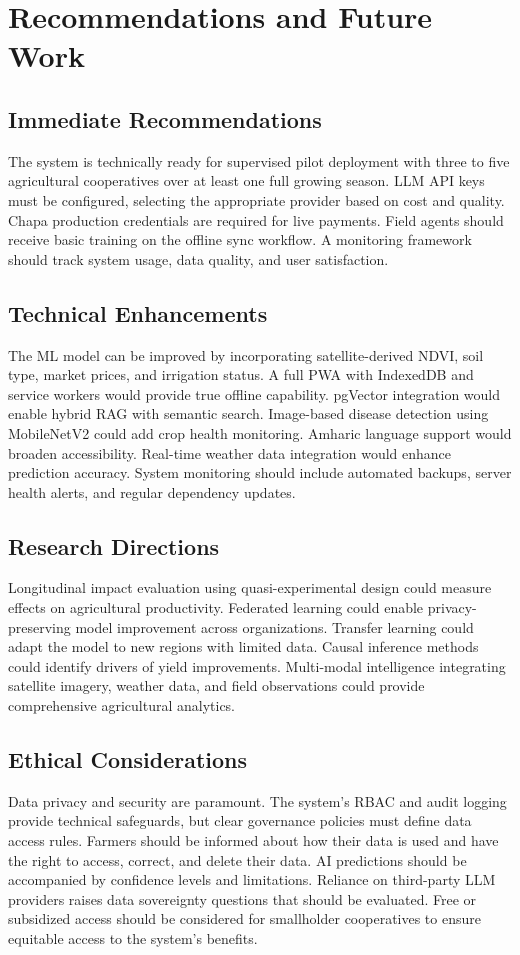 \documentclass[12pt,a4paper,oneside]{report}
\begin{document}
\section{Recommendations and Future Work}
\subsection{Immediate Recommendations}
The system is technically ready for supervised pilot deployment with three to five agricultural cooperatives over at least one full growing season. LLM API keys must be configured, selecting the appropriate provider based on cost and quality. Chapa production credentials are required for live payments. Field agents should receive basic training on the offline sync workflow. A monitoring framework should track system usage, data quality, and user satisfaction.

\subsection{Technical Enhancements}
The ML model can be improved by incorporating satellite-derived NDVI, soil type, market prices, and irrigation status. A full PWA with IndexedDB and service workers would provide true offline capability. pgVector integration would enable hybrid RAG with semantic search. Image-based disease detection using MobileNetV2 could add crop health monitoring. Amharic language support would broaden accessibility. Real-time weather data integration would enhance prediction accuracy. System monitoring should include automated backups, server health alerts, and regular dependency updates.

\subsection{Research Directions}
Longitudinal impact evaluation using quasi-experimental design could measure effects on agricultural productivity. Federated learning could enable privacy-preserving model improvement across organizations. Transfer learning could adapt the model to new regions with limited data. Causal inference methods could identify drivers of yield improvements. Multi-modal intelligence integrating satellite imagery, weather data, and field observations could provide comprehensive agricultural analytics.

\subsection{Ethical Considerations}
Data privacy and security are paramount. The system's RBAC and audit logging provide technical safeguards, but clear governance policies must define data access rules. Farmers should be informed about how their data is used and have the right to access, correct, and delete their data. AI predictions should be accompanied by confidence levels and limitations. Reliance on third-party LLM providers raises data sovereignty questions that should be evaluated. Free or subsidized access should be considered for smallholder cooperatives to ensure equitable access to the system's benefits.
\end{document}
